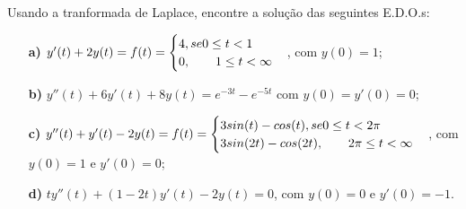 \linespread{1.5}

Usando a tranformada de Laplace, encontre a solução das seguintes E.D.O.s:

\begin{itemize}
    \item[\textbf{a)}] $y'(t) + 2y(t) = f(t) = \begin{cases}
    4, se 0\leq t < 1\\
    0, \hspace{0.7cm} 1\leq t< \infty
    \end{cases}$, com $y(0) = 1$;
    \item[\textbf{b)}] $y''(t) + 6y'(t) + 8y(t) = e^{-3t} - e^{-5t}$ com $y(0) = y'(0) = 0$;
    \item[\textbf{c)}]$y''(t) + y'(t) - 2y(t) = f(t) = \begin{cases}
    3sin(t) - cos(t), se 0\leq t < 2\pi\\
    3sin(2t) - cos(2t), \hspace{0.7cm} 2\pi\leq t< \infty
    \end{cases}$, com $y(0) = 1$ e $y'(0) = 0$;
    \item[\textbf{d)}] $ty''(t) + (1-2t)y'(t) - 2y(t) = 0$, com $y(0) = 0$ e $y'(0) = -1$.
\end{itemize}